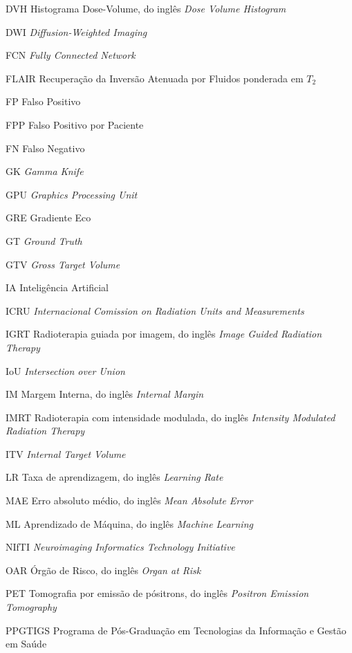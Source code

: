 \begin{siglas}
    \item[DVH] Histograma Dose-Volume, do inglês \textit{Dose Volume Histogram}
    \item[DWI] \textit{Diffusion-Weighted Imaging}
    \item[FCN] \textit{Fully Connected Network}
    \item[FLAIR] Recuperação da Inversão Atenuada por Fluidos ponderada em $T_2$ 
    \item[FP] Falso Positivo
    \item[FPP] Falso Positivo por Paciente
    \item[FN] Falso Negativo
    \item[GK] \textit{Gamma Knife}
    \item[GPU] \textit{Graphics Processing Unit}
    \item[GRE] Gradiente Eco
    \item[GT] \textit{Ground Truth}
    \item[GTV] \textit{Gross Target Volume}
    \item[IA] Inteligência Artificial
    \item[ICRU] \textit{Internacional Comission on Radiation Units and Measurements}
    \item[IGRT] Radioterapia guiada por imagem, do inglês \textit{Image Guided Radiation Therapy}
    \item[IoU] \textit{Intersection over Union}
    \item[IM] Margem Interna, do inglês \textit{Internal Margin}
    \item[IMRT] Radioterapia com intensidade modulada, do inglês \textit{Intensity Modulated Radiation Therapy}
    \item[ITV] \textit{Internal Target Volume}
    \item[LR] Taxa de aprendizagem, do inglês \textit{Learning Rate}
    \item[MAE] Erro absoluto médio, do inglês \textit{Mean Absolute Error}
    \item[ML] Aprendizado de Máquina, do inglês \textit{Machine Learning}
    \item[NIfTI] \textit{Neuroimaging Informatics Technology Initiative}
    \item[OAR] Órgão de Risco, do inglês \textit{Organ at Risk}
    \item[PET] Tomografia por emissão de pósitrons, do inglês \textit{Positron Emission Tomography}
	  \item[PPGTIGS] Programa de Pós-Graduação em Tecnologias da Informação e Gestão em Saúde

\end{siglas}
